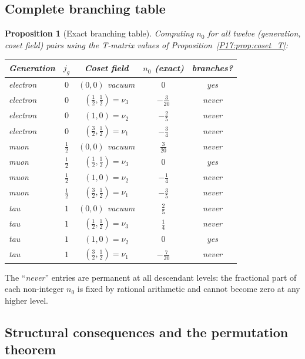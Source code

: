 \documentclass[11pt,a4paper]{article}
\newtheorem{proposition}[theorem]{Proposition}
\theoremstyle{definition}\newtheorem{definition}[theorem]{Definition}
\theoremstyle{remark}
\begin{document}
\subsection{Complete branching table}

\begin{proposition}[Exact branching table]
\label{P17:prop:pmns_branching}
Computing $n_0$ for all twelve (generation, coset field) pairs
using the T-matrix values of Proposition~\ref{P17:prop:coset_T}:
\begin{center}
\renewcommand{\arraystretch}{1.3}
\begin{tabular}{lcccc}
\toprule
Generation & $j_g$ & Coset field & $n_0$ (exact) & branches? \\
\midrule
electron & $0$ & $(0,0)$ vacuum & $0$ & yes \\
electron & $0$ & $(\tfrac12,\tfrac12)=\nu_3$ & $-\tfrac{3}{20}$ & \emph{never} \\
electron & $0$ & $(1,0)=\nu_2$ & $-\tfrac{2}{5}$ & \emph{never} \\
electron & $0$ & $(\tfrac32,\tfrac12)=\nu_1$ & $-\tfrac{3}{4}$ & \emph{never} \\
\midrule
muon & $\tfrac12$ & $(0,0)$ vacuum & $\tfrac{3}{20}$ & \emph{never} \\
muon & $\tfrac12$ & $(\tfrac12,\tfrac12)=\nu_3$ & $0$ & yes \\
muon & $\tfrac12$ & $(1,0)=\nu_2$ & $-\tfrac{1}{4}$ & \emph{never} \\
muon & $\tfrac12$ & $(\tfrac32,\tfrac12)=\nu_1$ & $-\tfrac{3}{5}$ & \emph{never} \\
\midrule
tau & $1$ & $(0,0)$ vacuum & $\tfrac{2}{5}$ & \emph{never} \\
tau & $1$ & $(\tfrac12,\tfrac12)=\nu_3$ & $\tfrac{1}{4}$ & \emph{never} \\
tau & $1$ & $(1,0)=\nu_2$ & $0$ & yes \\
tau & $1$ & $(\tfrac32,\tfrac12)=\nu_1$ & $-\tfrac{7}{20}$ & \emph{never} \\
\bottomrule
\end{tabular}
\end{center}
\end{proposition}

The ``\emph{never}'' entries are permanent at all descendant levels:
the fractional part of each non-integer $n_0$ is fixed by rational
arithmetic and cannot become zero at any higher level.

\subsection{Structural consequences and the permutation theorem}
\end{document}

